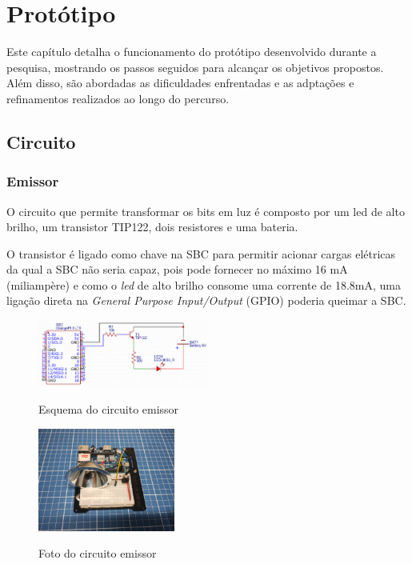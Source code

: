\section{Protótipo}

Este capítulo detalha o funcionamento do protótipo desenvolvido durante a pesquisa, mostrando os passos seguidos para alcançar os objetivos propostos. Além disso, são abordadas as dificuldades enfrentadas e as adptações e refinamentos realizados ao longo do percurso.

\subsection{Circuito}

\subsubsection{Emissor}

O circuito que permite transformar os bits em luz é composto por um led de alto brilho, um transistor TIP122, dois resistores e uma bateria.

O transistor é ligado como chave na SBC para permitir acionar cargas elétricas da qual a SBC não seria capaz, pois pode fornecer no máximo 16 mA (miliampère)  e como o \textit{led} de alto brilho consome uma corrente de 18.8mA, uma ligação direta na \textit{General Purpose Input/Output} (GPIO) poderia queimar a SBC.

\begin{figure}[!htbp]
  \caption{Esquema do circuito emissor}
  \includegraphics[width=0.5\textwidth]{images/esquema_circuito_emisor.png}
  \label{esquema-circuito-emissor}
\end{figure}

\begin{figure}[!htbp]
  \caption{Foto do circuito emissor}
  \includegraphics[width=0.4\textwidth]{images/foto_circuito_emisor.jpg}
  \label{foto-circuito-emissor}
\end{figure}

